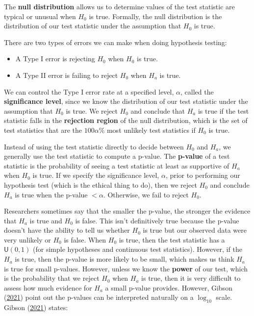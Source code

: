 \documentclass[
]{book}
\providecommand{\tightlist}{%
  \setlength{\itemsep}{0pt}\setlength{\parskip}{0pt}}
\theoremstyle{definition}
\theoremstyle{definition}
\theoremstyle{definition}
\theoremstyle{definition}
\theoremstyle{remark}
\begin{document}
The \textbf{null distribution} allows us to determine values of the test statistic are typical or unusual when \(H_0\) is true. Formally, the null distribution is the distribution of our test statistic under the assumption that \(H_0\) is true.

There are two types of errors we can make when doing hypothesis testing:

\begin{itemize}
\tightlist
\item
  A Type I error is rejecting \(H_0\) when \(H_0\) is true.
\item
  A Type II error is failing to reject \(H_0\) when \(H_a\) is true.
\end{itemize}

We can control the Type I error rate at a specified level, \(\alpha\), called the \textbf{significance level}, since we know the distribution of our
test statistic under the assumption that \(H_0\) is true. We reject \(H_0\)
and conclude that \(H_a\) is true if the test statistic falls in the
\textbf{rejection region} of the null distribution, which is the set of test
statistics that are the \(100\alpha\%\) most unlikely test statistics if
\(H_0\) is true.

Instead of using the test statistic directly to decide between \(H_0\) and
\(H_a\), we generally use the test statistic to compute a p-value. The
\textbf{p-value} of a test statistic is the probability of seeing a test
statistic at least as supportive of \(H_a\) when \(H_0\) is true. If we
specify the significance level, \(\alpha\), prior to performing our
hypothesis test (which is the ethical thing to do), then we reject \(H_0\)
and conclude \(H_a\) is true when the p-value \(<\alpha\). Otherwise, we
fail to reject \(H_0\).

Researchers sometimes say that the smaller the p-value, the stronger the
evidence that \(H_a\) is true and \(H_0\) is false. This isn't definitively
true because the p-value doesn't have the ability to tell us whether
\(H_0\) is true but our observed data were very unlikely or \(H_0\) is
false. When \(H_0\) is true, then the test statistic has a
\(\mathsf{U}(0,1)\) (for simple hypotheses and continuous test
statistics). However, if the \(H_a\) is true, then the p-value is more
likely to be small, which makes us think \(H_a\) is true for small
p-values. However, unless we know the \textbf{power} of our test, which is
the probability that we reject \(H_0\) when \(H_a\) is true, then it is very
difficult to assess how much evidence for \(H_a\) a small p-value
provides. However, Gibson (\protect\hyperlink{ref-gibson_pvalue}{2021}) point out the p-values can be
interpreted naturally on a \(\log_{10}\) scale. Gibson (\protect\hyperlink{ref-gibson_pvalue}{2021}) states:
\end{document}

